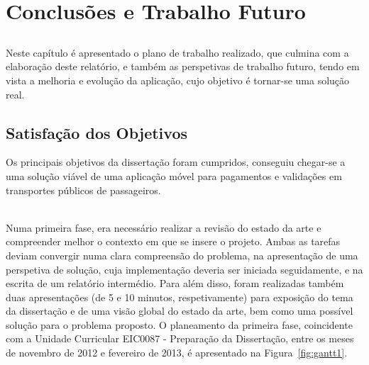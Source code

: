 \chapter{Conclusões e Trabalho Futuro} \label{chap:concl}

\section*{}

Neste capítulo é apresentado o plano de trabalho realizado, que culmina com a elaboração deste relatório, e também as perspetivas de trabalho futuro, tendo em vista a melhoria e evolução da aplicação, cujo objetivo é tornar-se uma solução real.

\section{Satisfação dos Objetivos}

Os principais objetivos da dissertação foram cumpridos, conseguiu chegar-se a uma solução viável de uma aplicação móvel para pagamentos e validações em transportes públicos de passageiros. 

~\\Numa primeira fase, era necessário realizar a revisão do estado da arte e compreender melhor o contexto em que se insere o projeto. Ambas as tarefas deviam convergir numa clara compreensão do problema, na apresentação de uma perspetiva de solução, cuja implementação deveria ser iniciada seguidamente, e na escrita de um relatório intermédio. Para além disso, foram realizadas também duas apresentações (de 5 e 10 minutos, respetivamente) para exposição do tema da dissertação e de uma visão global do estado da arte, bem como uma possível solução para o problema proposto. O planeamento da primeira fase, coincidente com a Unidade Curricular EIC0087 - Preparação da Dissertação,  entre os meses de novembro de 2012 e fevereiro de 2013, é apresentado na Figura~\ref{fig:gantt1}.

